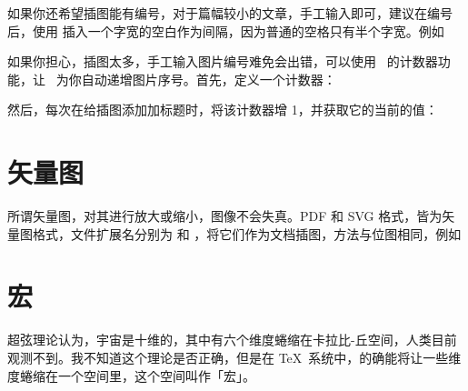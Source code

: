 \indentation 如果你还希望插图能有编号，对于篇幅较小的文章，手工输入即可，建议在编号后，使用 \type{\quad} 插入一个字宽的空白作为间隔，因为普通的空格只有半个字宽。例如

\starttyping[option=TEX]
\stoptyping


如果你担心，插图太多，手工输入图片编号难免会出错，可以使用 \ConTeXt\ 的计数器功能，让 \ConTeXt\ 为你自动递增图片序号。首先，定义一个计数器：

\starttyping[option=TEX]
\stoptyping

\noindent 然后，每次在给插图添加加标题时，将该计数器增 1，并获取它的当前的值：

\starttyping[option=TEX]
\incrementnumber[myfig]
\blank[line]
\incrementnumber[myfig]
\stoptyping

\incrementnumber[myfig]
\incrementnumber[myfig]

\section{矢量图}

所谓矢量图，对其进行放大或缩小，图像不会失真。PDF 和 SVG 格式，皆为矢量图格式，文件扩展名分别为  和 ，将它们作为文档插图，方法与位图相同，例如

\starttyping[option=TEX]
\stoptyping

\section{宏}

超弦理论认为，宇宙是十维的，其中有六个维度蜷缩在卡拉比-丘空间，人类目前观测不到。我不知道这个理论是否正确，但是在 \TeX\ 系统中，的确能将让一些维度蜷缩在一个空间里，这个空间叫作「宏」。

